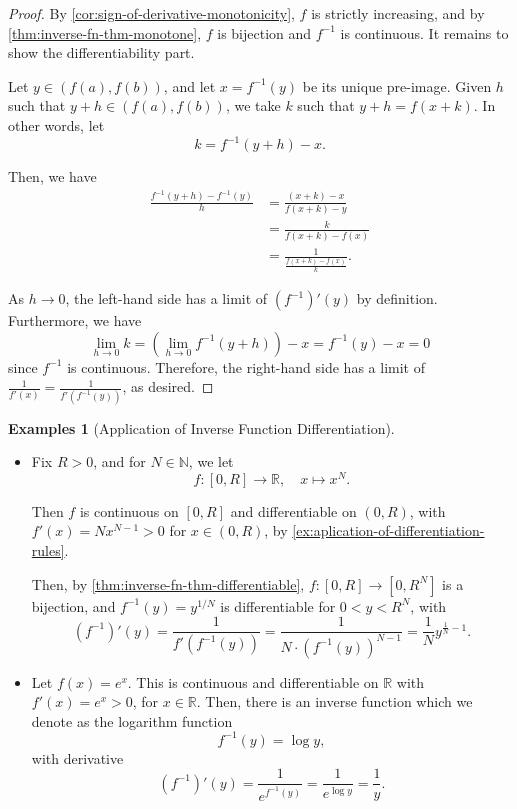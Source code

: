 \documentclass[11pt]{article}
\numberwithin{equation}{section}
\theoremstyle{definition}
\newtheorem{examples}[theorem]{Examples}
\theoremstyle{remark}
\newcommand{\pqty}[1]{\left(#1\right)}
\newcommand{\ccintv}[2]{[#1,#2]}
\newcommand{\oointv}[2]{(#1,#2)}
\newcommand{\functiondomain}[3]{#1:#2\to #3}
\newcommand{\function}[5]{#1:#2\to #3,\quad #4\mapsto #5}
\newcommand{\RR}{\mathbb R}
\newcommand{\NN}{\mathbb N}
\newcommand{\inverse}{^{-1}}
\begin{document}
\begin{proof}
    By \autoref{cor:sign-of-derivative-monotonicity}, \(f\) is strictly increasing, and by \autoref{thm:inverse-fn-thm-monotone}, \(f\) is bijection and \(f\inverse\) is continuous. It remains to show the differentiability part.

    Let \(y \in \oointv{f\pqty{a}}{f\pqty{b}}\), and let \(x = f\inverse\pqty{y}\) be its unique pre-image. Given \(h\) such that \(y + h \in \oointv{f\pqty{a}}{f\pqty{b}}\), we take \(k\) such that \(y + h = f\pqty{x + k}\). In other words, let
    \[
        k = f\inverse\pqty{y + h} - x.
    \]

    Then, we have
    \begin{align*}
        \frac{f\inverse\pqty{y + h} - f\inverse\pqty{y}}{h} &= \frac{\pqty{x + k} - x}{f\pqty{x + k} - y} \\
        &= \frac{k}{f\pqty{x + k} - f\pqty{x}} \\
        &= \frac{1}{\frac{f\pqty{x + k} - f\pqty{x}}{k}}.
    \end{align*}

    As \(h \to 0\), the left-hand side has a limit of \(\pqty{f\inverse}' \pqty{y}\) by definition. Furthermore, we have
    \[
        \lim_{h \to 0} k = \pqty{\lim_{h \to 0} f\inverse\pqty{y + h}} - x = f\inverse\pqty{y} - x = 0
    \]
    since \(f\inverse\) is continuous. Therefore, the right-hand side has a limit of \(\frac{1}{f'\pqty{x}} = \frac{1}{f'\pqty{f\inverse\pqty{y}}}\), as desired.
\end{proof}

\begin{examples}[Application of Inverse Function Differentiation]\label{analysis-unit-0118}
    \label{ex:inverse-fn-differentiation}%
    \begin{itemize}
        \item Fix \(R > 0\), and for \(N \in \NN\), we let
        \[
            \function{f}{\ccintv{0}{R}}{\RR}{x}{x^N.}
        \]

        Then \(f\) is continuous on \(\ccintv{0}{R}\) and differentiable on \(\oointv{0}{R}\), with \(f'\pqty{x} = N x^{N - 1} > 0\) for \(x \in \oointv{0}{R}\), by \autoref{ex:aplication-of-differentiation-rules}.

        Then, by \autoref{thm:inverse-fn-thm-differentiable}, \(\functiondomain{f}{\ccintv{0}{R}}{\ccintv{0}{R^N}}\) is a bijection, and \(f^{-1}(y)=y^{1/N}\) is differentiable for \(0<y<R^N\), with
        \[
            \pqty{f\inverse}' \pqty{y} = \frac{1}{f'\pqty{f\inverse\pqty{y}}} = \frac{1}{N \cdot \pqty{f\inverse\pqty{y}}^{N - 1}} = \frac{1}{N} y^{\frac{1}{N} - 1}.
        \]

        \item Let \(f\pqty{x} = e^x\). This is continuous and differentiable on \(\RR\) with \(f'\pqty{x} = e^x > 0\), for \(x \in \RR\). Then, there is an inverse function which we denote as the logarithm function
        \[
            f\inverse\pqty{y} = \log y,
        \]
        with derivative
        \[
            \pqty{f\inverse}'\pqty{y} = \frac{1}{e^{f\inverse\pqty{y}}} = \frac{1}{e^{\log y}} = \frac{1}{y}.
        \]
    \end{itemize}
\end{examples}
\end{document}
